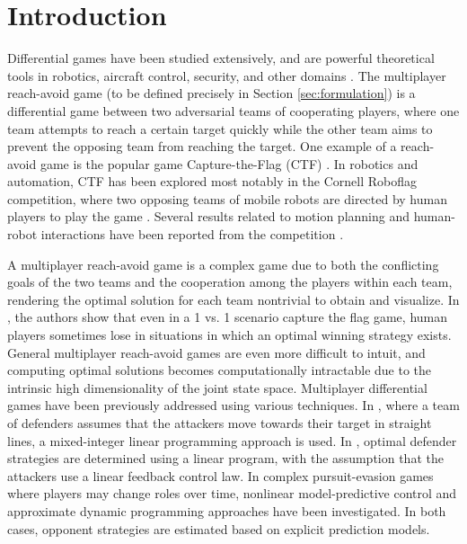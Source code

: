 \section{Introduction}
\label{sec:intro}
Differential games have been studied extensively, and are powerful theoretical tools in robotics, aircraft control, security, and other domains \cite{OFTHEAIRFORCEWASHINGTON:2009p37, Erzberger:2006p44, kiva2009}. The multiplayer reach-avoid game (to be defined precisely in Section \ref{sec:formulation}) is a differential game between two adversarial teams of cooperating players, where one team attempts to reach a certain target quickly while the other team aims to prevent the opposing team from reaching the target. One example of a reach-avoid game is the popular game Capture-the-Flag (CTF) \cite{HThesis, Huang2011}. In robotics and automation, CTF has been explored most notably in the Cornell Roboflag competition, where two opposing teams of mobile robots are directed by human players to play the game \cite{DAndrea:2003p95}. Several results related to motion planning and human-robot interactions have been reported from the competition \cite{Earl:2007p101, Campbell:2003p5, Waydo:2003p97, Parasuraman:2005p99}. 

A multiplayer reach-avoid game is a complex game due to both the conflicting goals of the two teams and the cooperation among the players within each team, rendering the optimal solution for each team nontrivial to obtain and visualize. In \cite{HThesis, Huang2011}, the authors show that even in a 1 vs. 1 scenario capture the flag game, human players sometimes lose in situations in which an optimal winning strategy exists. General multiplayer reach-avoid games are even more difficult to intuit, and computing optimal solutions becomes computationally intractable due to the intrinsic high dimensionality of the joint state space. Multiplayer differential games have been previously addressed using various techniques. In \cite{Earl:2007p101}, where a team of defenders assumes that the attackers move towards their target in straight lines, a mixed-integer linear programming approach is used. In \cite{Chasparis:2005p102}, optimal defender strategies are determined using a linear program, with the assumption that the attackers use a linear feedback control law. In complex pursuit-evasion games where players may change roles over time, nonlinear model-predictive control \cite{Sprinkle:2004p100} and approximate dynamic programming \cite{McGrew:2008p103} approaches have been investigated. In both cases, opponent strategies are estimated based on explicit prediction models.

